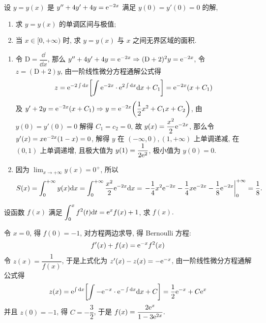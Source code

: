 \begin{example}
    设 $y=y(x)$ 是 $y''+4y'+4y=\mathrm{e} ^{-2x}$ 满足 $y(0)=y'(0)=0$ 的解,
    \begin{enumerate}[label=(\arabic{*})]
        \item 求 $y=y(x)$ 的单调区间与极值;
        \item 当 $x\in[0,+\infty)$ 时, 求 $y=y(x)$ 与 $x$ 之间无界区域的面积.
    \end{enumerate}
\end{example}
\begin{solution}
    \begin{enumerate}[label=(\arabic{*})]
        \item 令 $\mathrm{D}=\dfrac{\dd}{\dd x}$, 那么 $y''+4y'+4y=\mathrm{e} ^{-2x}\Rightarrow(\mathrm{D}+2)^2y=\mathrm{e} ^{-2x}$, 令 $z=(\mathrm{D}+2)y$, 由一阶线性微分方程通解公式得 $$z=\mathrm{e} ^{-2\int \dd x}\qty[\int \mathrm{e} ^{-2x}\cdot \mathrm{e} ^{2\int \dd x}\dd x+C_1]=\mathrm{e} ^{-2x}\qty(x+C_1)$$
        及 $y'+2y=\mathrm{e} ^{-2x}\qty(x+C_1)\Rightarrow y=\mathrm{e} ^{-2x}\qty(\dfrac{1}{2}x^2+C_1 x+C_2)$, 由 $y(0)=y'(0)=0$ 解得 $C_1=c_2=0$, 故 $y(x)=\dfrac{x^2}{2}\mathrm{e} ^{-2x}$, 那么令 $y'(x)=x\mathrm{e} ^{-2x}(1-x)=0$, 解得 $y$ 在 $(-\infty,0),(1,+\infty)$ 上单调递减, 在 $(0,1)$ 上单调递增, 且极大值为 $y(1)=\dfrac{1}{2\mathrm{e} ^{2}}$, 极小值为 $y(0)=0.$
        \item 因为 $ \displaystyle \lim_{x \to +\infty} y(x)=0^+$, 所以 
        $$
        S(x)=\int_{0}^{+\infty} y(x) \dd x=\int_{0}^{+\infty} \dfrac{x^2}{2}\e ^{-2x} \dd x=\eval{-\dfrac{1}{4}x^2 \e ^{-2x}-\dfrac{1}{4}x \e ^{-2x}-\dfrac{1}{8}\e ^{-2x}}_{0}^{+\infty}=\dfrac{1}{8}.
        $$
    \end{enumerate}
\end{solution}

\begin{example}[2023 四川大学]
    设函数 $f(x)$ 满足 $\displaystyle\int_{0}^{x}f^2(t)\dd t=\mathrm{e} ^xf(x)+1$, 求 $f(x).$
\end{example}
\begin{solution}
    令 $x=0$, 得 $f(0)=-1$, 对方程两边求导, 得 Bernoulli 方程:
    $$f'(x)+f(x)=\mathrm{e} ^{-x}f^2(x)$$
    令 $z(x)=\dfrac{1}{f(x)}$, 于是上式化为 $z'(x)-z(x)=-\mathrm{e} ^{-x}$, 由一阶线性微分方程通解公式得
    $$z(x)=\mathrm{e} ^{\int\dd x}\qty[\int-\mathrm{e} ^{-x}\cdot\mathrm{e} ^{-\int\dd x}\dd x+C]=\dfrac{1}{2}\mathrm{e} ^{-x}+C\mathrm{e} ^x$$
    并且 $z(0)=-1$, 得 $C=-\dfrac{3}{2}$, 于是 $f(x)=\dfrac{2\mathrm{e} ^{x}}{1-3\mathrm{e} ^{2x}}.$
\end{solution}

